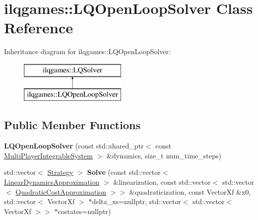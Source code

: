 \hypertarget{classilqgames_1_1_l_q_open_loop_solver}{}\section{ilqgames\+:\+:L\+Q\+Open\+Loop\+Solver Class Reference}
\label{classilqgames_1_1_l_q_open_loop_solver}
Inheritance diagram for ilqgames\+:\+:L\+Q\+Open\+Loop\+Solver\+:\begin{figure}[H]
\begin{center}
\leavevmode
\includegraphics[height=2.000000cm]{classilqgames_1_1_l_q_open_loop_solver}
\end{center}
\end{figure}
\subsection*{Public Member Functions}
\begin{DoxyCompactItemize}
\item 
{\bfseries L\+Q\+Open\+Loop\+Solver} (const std\+::shared\+\_\+ptr$<$ const \hyperlink{classilqgames_1_1_multi_player_integrable_system}{Multi\+Player\+Integrable\+System} $>$ \&dynamics, size\+\_\+t num\+\_\+time\+\_\+steps)\hypertarget{classilqgames_1_1_l_q_open_loop_solver_a77e32ee045b0136d5813d3c70c025ca6}{}\label{classilqgames_1_1_l_q_open_loop_solver_a77e32ee045b0136d5813d3c70c025ca6}

\item 
std\+::vector$<$ \hyperlink{structilqgames_1_1_strategy}{Strategy} $>$ {\bfseries Solve} (const std\+::vector$<$ \hyperlink{structilqgames_1_1_linear_dynamics_approximation}{Linear\+Dynamics\+Approximation} $>$ \&linearization, const std\+::vector$<$ std\+::vector$<$ \hyperlink{structilqgames_1_1_quadratic_cost_approximation}{Quadratic\+Cost\+Approximation} $>$$>$ \&quadraticization, const Vector\+Xf \&x0, std\+::vector$<$ Vector\+Xf $>$ $\ast$delta\+\_\+xs=nullptr, std\+::vector$<$ std\+::vector$<$ Vector\+Xf $>$$>$ $\ast$costates=nullptr)\hypertarget{classilqgames_1_1_l_q_open_loop_solver_abd32db3a9752b41495ff4fb1ed087f3a}{}\label{classilqgames_1_1_l_q_open_loop_solver_abd32db3a9752b41495ff4fb1ed087f3a}

\end{DoxyCompactItemize}
